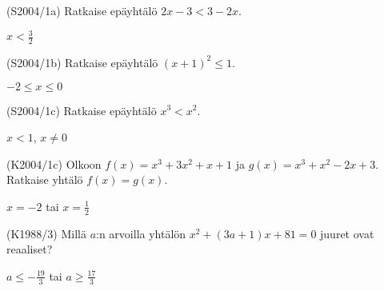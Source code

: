 \begin{tehtava}
(S2004/1a) Ratkaise epäyhtälö $2x-3<3-2x$.
\begin{vastaus}
$x<\frac{3}{2}$ 
\end{vastaus}
\end{tehtava}

\begin{tehtava}
(S2004/1b) Ratkaise epäyhtälö $(x+1)^2 \leq 1$.
\begin{vastaus}
$-2 \leq x \leq 0$ 
\end{vastaus}
\end{tehtava}

\begin{tehtava}
(S2004/1c) Ratkaise epäyhtälö $x^3<x^2$.
\begin{vastaus}
$x<1$, $x\neq0$ 
\end{vastaus}
\end{tehtava}

\begin{tehtava}
(K2004/1c) Olkoon $f(x)=x^3+3x^2+x+1$ ja $g(x)=x^3+x^2-2x+3$. Ratkaise yhtälö $f(x)=g(x)$.
\begin{vastaus}
$x=-2$ tai $x=\frac{1}{2}$  
\end{vastaus}
\end{tehtava}

\begin{tehtava}
(K1988/3) Millä $a$:n arvoilla yhtälön $x^2+(3a+1)x+81=0$ juuret ovat reaaliset?
\begin{vastaus}
$a \leq -\frac{19}{3}$ tai $a \geq \frac{17}{3}$
\end{vastaus}
\end{tehtava}

